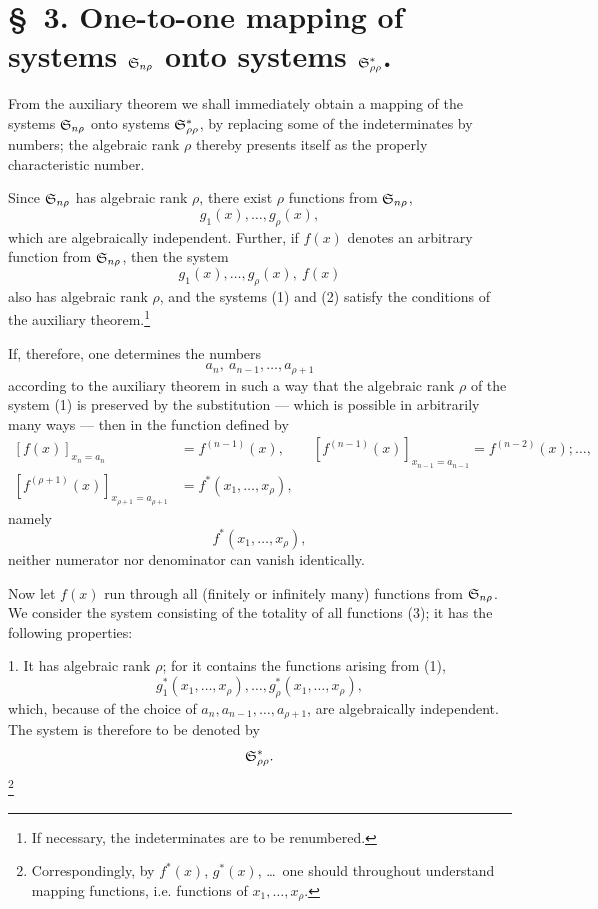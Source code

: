 \documentclass[11pt]{article}
\begin{document}
\section*{\S\ 3. One-to-one mapping of systems $\mathfrak{S}_{n\rho}$ onto systems $\mathfrak{S}^*_{\rho\rho}$.}

From the auxiliary theorem we shall immediately obtain a mapping of the systems $\mathfrak{S}_{n\rho}$ onto systems $\mathfrak{S}^*_{\rho\rho}$, by replacing some of the indeterminates by numbers; the algebraic rank $\rho$ thereby presents itself as the properly characteristic number.

Since $\mathfrak{S}_{n\rho}$ has algebraic rank $\rho$, there exist $\rho$ functions from $\mathfrak{S}_{n\rho}$,
\begin{equation}
  g_1(x),\ldots,g_\rho(x),
\tag{1}
\end{equation}
which are algebraically independent. Further, if $f(x)$ denotes an arbitrary function from $\mathfrak{S}_{n\rho}$, then the system
\begin{equation}
  g_1(x),\ldots,g_\rho(x),\ f(x)
\tag{2}
\end{equation}
also has algebraic rank $\rho$, and the systems (1) and (2) satisfy the conditions of the auxiliary theorem.\footnote{If necessary, the indeterminates are to be renumbered.}

If, therefore, one determines the numbers
\[
  a_n,\ a_{n-1},\ldots,a_{\rho+1}
\]
according to the auxiliary theorem in such a way that the algebraic rank $\rho$ of the system (1) is preserved by the substitution --- which is possible in arbitrarily many ways --- then in the function defined by
\[
\begin{aligned}
 [f(x)]_{x_n=a_n}&=f^{(n-1)}(x),\qquad
 [f^{(n-1)}(x)]_{x_{n-1}=a_{n-1}}=f^{(n-2)}(x);\ldots,\\
 [f^{(\rho+1)}(x)]_{x_{\rho+1}=a_{\rho+1}}&=f^*(x_1,\ldots,x_\rho),
\end{aligned}
\]
namely
\begin{equation}
  f^*(x_1,\ldots,x_\rho),
\tag{3}
\end{equation}
neither numerator nor denominator can vanish identically.

Now let $f(x)$ run through all (finitely or infinitely many) functions from $\mathfrak{S}_{n\rho}$. We consider the system consisting of the totality of all functions (3); it has the following properties:

1. It has algebraic rank $\rho$; for it contains the functions arising from (1),
\[
  g_1^*(x_1,\ldots,x_\rho),\ldots,g_\rho^*(x_1,\ldots,x_\rho),
\]
which, because of the choice of $a_n,a_{n-1},\ldots,a_{\rho+1}$, are algebraically independent. The system is therefore to be denoted by
\[
  \mathfrak{S}^*_{\rho\rho}.
\]
\footnote{Correspondingly, by $f^*(x)$, $g^*(x)$, \ldots\ one should throughout understand mapping functions, i.e. functions of $x_1,\ldots,x_\rho$.}
\end{document}
